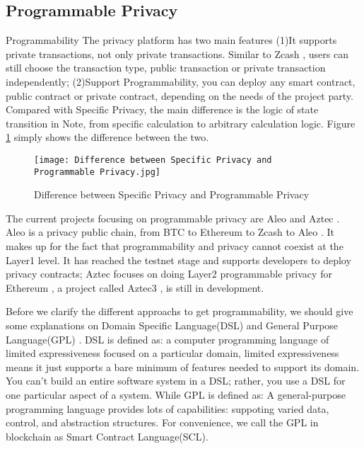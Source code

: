 \subsection{Programmable Privacy}

Programmability The privacy platform has two main features (1)It supports private 
transactions, not only private transactions. Similar to Zcash \cite{website:Zcash}, users can still 
choose the transaction type, public transaction or private transaction independently; 
(2)Support Programmability, you can deploy any smart contract, public contract or 
private contract, depending on the needs of the project party. Compared with Specific 
Privacy, the main difference is the logic of state transition in Note, from specific 
calculation to arbitrary calculation logic. Figure \ref{fig:Difference between Specific Privacy and Programmable Privacy} simply shows the difference 
between the two.
\begin{figure}[!ht]
    \centering
    \texttt{[image: Difference between Specific Privacy and Programmable Privacy.jpg]}
    \caption{Difference between Specific Privacy and Programmable Privacy}
    \label{fig:Difference between Specific Privacy and Programmable Privacy}
\end{figure}

The current projects focusing on programmable privacy are Aleo \cite{website:Aleo} and Aztec \cite{website:Aztec}. Aleo \cite{website:Aleo} is a 
privacy public chain, from BTC \cite{website:BTC} to Ethereum \cite{website:Ethereum} to Zcash \cite{website:Zcash} to Aleo \cite{website:Aleo}. It makes up for 
the fact that programmability and privacy cannot coexist at the Layer1 level. 
It has reached the testnet stage and supports developers to deploy privacy contracts; 
Aztec \cite{website:Aztec} focuses on doing Layer2 programmable privacy for Ethereum \cite{website:Ethereum} , a project 
called Aztec3 \cite{website:Aztec3}, is still in development.

Before we clarify the different approachs to get programmability, we should give some explanations on Domain Specific Language(DSL)  \cite{website:DSL} and General Purpose Language(GPL)  \cite{website:DSL}.
DSL \cite{website:DSL} is defined as: a computer programming language of limited expressiveness focused on a particular domain, limited expressiveness means it just supports a bare minimum of features 
needed to support its domain. You can't build an entire software system in a DSL; rather, you use a DSL \cite{website:DSL} for one particular aspect of a system. While GPL \cite{website:DSL} is defined as: A general-purpose programming language
provides lots of capabilities: suppoting varied data, control, and abstraction structures. For convenience, we call the GPL in blockchain as Smart Contract Language(SCL).

